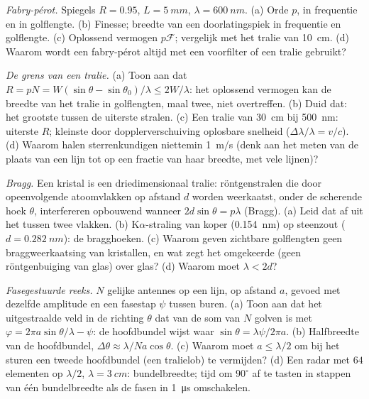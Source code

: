 \begin{exercise}[$\star\star$]\label{exo:b2:gratings:9}
\emph{Fabry-pérot.} Spiegels $R = 0.95$, $L = \qty{5}{mm}$,
$\lambda = \qty{600}{nm}$.
(a) Orde $p$,  in frequentie en in golflengte. (b)
Finesse; breedte van een doorlatingspiek in frequentie en golflengte. (c)
Oplossend vermogen $p\mathcal F$; vergelijk met het tralie van \qty{10}{cm}.
(d) Waarom
wordt een fabry-pérot altijd met een voorfilter of een tralie gebruikt?
\end{exercise}

\begin{exercise}[$\star\star\star$]\label{exo:b2:gratings:10}
\emph{De grens van een tralie.} (a) Toon aan dat
$R = pN = W(\sin\theta - \sin\theta_0)
/\lambda \le 2W/\lambda$: het
oplossend vermogen kan de breedte van het
tralie in golflengten, maal twee, niet overtreffen. (b) Duid dat: het grootste
 tussen de uiterste stralen. (c) Een tralie van \qty{30}{cm} bij
\qty{500}{nm}: uiterste $R$; kleinste door dopplerverschuiving oplosbare snelheid
($\Delta\lambda/\lambda = v/c$). (d) Waarom halen sterrenkundigen niettemin
\qty{1}{m/s}
(denk aan het meten van de plaats van een lijn tot op een fractie van haar breedte,
met vele lijnen)?
\end{exercise}

\begin{exercise}[$\star\star\star$]\label{exo:b2:gratings:11}
\emph{Bragg.} Een kristal is een driedimensionaal tralie: röntgenstralen
die door opeenvolgende atoomvlakken op afstand $d$ worden weerkaatst, onder de
scherende hoek $\theta$, interfereren opbouwend wanneer $2d\sin\theta = p\lambda$
(Bragg). (a) Leid dat af uit het  tussen twee vlakken.
(b) K$\alpha$-straling van koper (\qty{0.154}{nm}) op steenzout
($d = \qty{0.282}{nm}$):
de bragghoeken. (c) Waarom geven zichtbare golflengten geen
braggweerkaatsing van kristallen, en wat zegt het omgekeerde (geen
röntgenbuiging van glas) over glas? (d) Waarom moet $\lambda < 2d$?
\end{exercise}

\begin{exercise}[$\star\star\star$]\label{exo:b2:gratings:12}
\emph{Fasegestuurde reeks.} $N$ gelijke antennes op een lijn, op afstand $a$, gevoed
met dezelfde amplitude en een fasestap $\psi$ tussen buren. (a)
Toon aan dat het uitgestraalde veld in de richting $\theta$ dat van de
som van $N$ golven is met $\varphi = 2\pi a\sin\theta/\lambda - \psi$: de
hoofdbundel wijst
waar $\sin\theta = \lambda\psi/2\pi a$. (b) Halfbreedte van de hoofdbundel,
$\Delta\theta
\approx \lambda/Na\cos\theta$. (c) Waarom moet
$a \le \lambda/2$ om bij het sturen een tweede hoofdbundel
(een tralielob) te vermijden? (d) Een radar met $64$ elementen op
$\lambda/2$, $\lambda = \qty{3}{cm}$: bundelbreedte; tijd om $90^\circ$ af
te tasten in stappen van één
bundelbreedte als de fasen in \qty{1}{\micro s} omschakelen.
\end{exercise}

